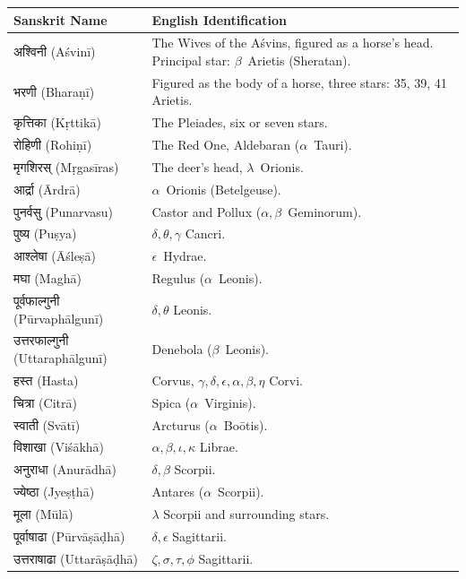 \documentclass[11pt,a4paper]{article}
\newcommand{\dev}[1]{{\devanagarifont #1}}
\theoremstyle{definition}
\begin{document}
\begin{longtable}{p{}p{}}
\toprule
\textbf{Sanskrit Name} & \textbf{English Identification} \\
\midrule
\endhead
\dev{अश्विनी} (A\'{s}vin\={i}) & The Wives of the A\'{s}vins, figured as a horse's head. Principal star: $\beta$~Arietis (Sheratan). \\
\dev{भरणी} (Bhara\d{n}\={i}) & Figured as the body of a horse, three stars: 35, 39, 41 Arietis. \\
\dev{कृत्तिका} (K\d{r}ttik\={a}) & The Pleiades, six or seven stars. \\
\dev{रोहिणी} (Rohi\d{n}\={i}) & The Red One, Aldebaran ($\alpha$~Tauri). \\
\dev{मृगशिरस्} (M\d{r}gas\={i}ras) & The deer's head, $\lambda$~Orionis. \\
\dev{आर्द्रा} (\=Ardr\={a}) & $\alpha$~Orionis (Betelgeuse). \\
\dev{पुनर्वसु} (Punarvasu) & Castor and Pollux ($\alpha, \beta$~Geminorum). \\
\dev{पुष्य} (Pu\d{s}ya) & $\delta, \theta, \gamma$ Cancri. \\
\dev{आश्लेषा} (\=A\'{s}le\d{s}\={a}) & $\epsilon$~Hydrae. \\
\dev{मघा} (Magh\={a}) & Regulus ($\alpha$~Leonis). \\
\dev{पूर्वफाल्गुनी} (P\={u}rvaph\=algun\={i}) & $\delta, \theta$ Leonis. \\
\dev{उत्तरफाल्गुनी} (Uttaraph\=algun\={i}) & Denebola ($\beta$~Leonis). \\
\dev{हस्त} (Hasta) & Corvus, $\gamma, \delta, \epsilon, \alpha, \beta, \eta$ Corvi. \\
\dev{चित्रा} (Citr\={a}) & Spica ($\alpha$~Virginis). \\
\dev{स्वाती} (Sv\=at\={i}) & Arcturus ($\alpha$~Bo\=otis). \\
\dev{विशाखा} (Vi\'{s}\=akh\={a}) & $\alpha, \beta, \iota, \kappa$ Librae. \\
\dev{अनुराधा} (Anur\=adh\={a}) & $\delta, \beta$ Scorpii. \\
\dev{ज्येष्ठा} (Jye\d{s}\d{t}h\={a}) & Antares ($\alpha$~Scorpii). \\
\dev{मूला} (M\=ul\={a}) & $\lambda$ Scorpii and surrounding stars. \\
\dev{पूर्वाषाढा} (P\={u}rv\=a\d{s}\=a\d{d}h\={a}) & $\delta, \epsilon$ Sagittarii. \\
\dev{उत्तराषाढा} (Uttar\=a\d{s}\=a\d{d}h\={a}) & $\zeta, \sigma, \tau, \phi$ Sagittarii. \\

\end{longtable}
\end{document}
